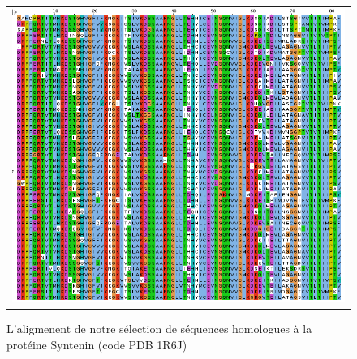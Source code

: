    \begin{figure}[t]
     \centering
     \begin{tabular}{c}
       \includegraphics[width=17cm]{homologues/1R6J.png} \\
     \end{tabular}
     \caption{L'aligmenent de notre sélection de séquences homologues à la protéine Syntenin (code PDB 1R6J)}
\label{align_homo:Syntenin}
   \end{figure}

